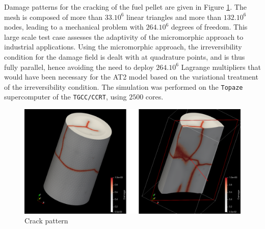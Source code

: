 Damage patterns for the cracking of the fuel pellet are given in Figure \ref{fig:micromorphic_damage:pellet_cracked}.
The mesh is composed of
more than $33. 10^6$
linear triangles and more than
$132. 10^6$
nodes, leading to a mechanical problem with 
\(264.10^6\)
degrees of freedom. This large scale test case assesses the adaptivity of the micromorphic approach to industrial
applications. Using the micromorphic approach, the irreversibility condition for the damage field is dealt with at quadrature points,
and is thus fully parallel, hence avoiding the need to deploy \(264.10^6\) Lagrange multipliers that would have been necessary
for the AT2 model based on the variational treatment of the irreversibility condition.
The simulation was performed on the \texttt{Topaze} supercomputer of the \texttt{TGCC/CCRT}, using $2500$ cores.
%
%
%
\begin{figure}[H]
  \centering
  \includegraphics[width=14.cm]{../chapter_003_ef_micromorphic/figures/FuelPelletCracking-results.pdf}
  \caption{Crack pattern}
  \label{fig:micromorphic_damage:pellet_cracked}
\end{figure}